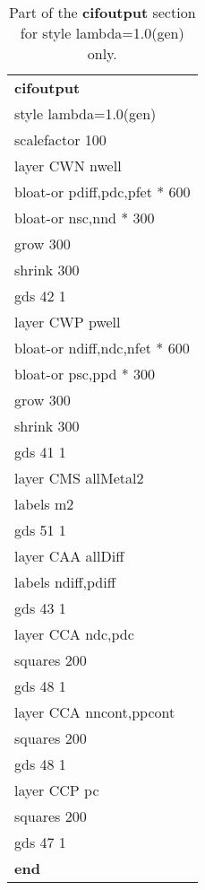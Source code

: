 \documentclass[letterpaper,twoside,12pt]{article}
\def\hinch{\hspace*{0.5in}}
\def\I{\hinch}
\def\II{\I\I}
\begin{document}
\begin{table}[ht!]
   \begin{center}
      \begin{tabular}{|l|} \hline
	   {\bfseries cifoutput} \\
	   style lambda=1.0(gen) \\
	   \I  scalefactor 100 \\
	   \I  layer CWN nwell \\
           \II  bloat-or pdiff,pdc,pfet * 600 \\
           \II  bloat-or nsc,nnd * 300 \\
           \II  grow 300 \\
           \II  shrink 300 \\
           \II  gds 42 1 \\
    	   \I  layer CWP pwell \\
           \II  bloat-or ndiff,ndc,nfet * 600 \\
           \II  bloat-or psc,ppd * 300 \\
           \II  grow 300 \\
           \II  shrink 300 \\
           \II  gds 41 1 \\
    	   \I  layer CMS allMetal2 \\
           \II  labels m2 \\
           \II  gds 51 1 \\
    	   \I  layer CAA allDiff \\
           \II  labels ndiff,pdiff \\
           \II  gds 43 1 \\
    	   \I  layer CCA ndc,pdc \\
           \II  squares 200 \\
           \II  gds 48 1 \\
    	   \I  layer CCA nncont,ppcont \\
           \II  squares 200 \\
           \II  gds 48 1 \\
    	   \I  layer CCP pc \\
           \II  squares 200 \\
           \II  gds 47 1 \\
	   {\bfseries end} \\ \hline
      \end{tabular}
      \caption{Part of the {\bfseries cifoutput} section for style
	   lambda=1.0(gen) only.}
      \label{cifoutput}
   \end{center}
\end{table}
\end{document}
